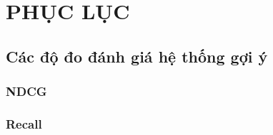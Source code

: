 \appendix

\chapter{PHỤC LỤC}
\label{Appendix1}
\graphicspath{{Appendix/AppendixFigs/}}
\section{Các độ đo đánh giá hệ thống gợi ý}
\label{chap_metrics}
\subsection{NDCG}
\subsection{Recall}